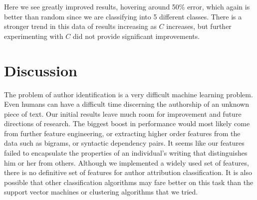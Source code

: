 \documentclass[12pt]{article}
\begin{document}
Here we see greatly improved results, hovering around 50\% error, which again is better than random since we are classifying into 5 different classes. There is a stronger trend in this data of results increasing as $C$ increases, but further experimenting with $C$ did not provide significant improvements.

\section{Discussion}
The problem of author identification is a very difficult machine learning problem. Even humans can have a difficult time discerning the authorship of an unknown piece of text. Our initial results leave much room for improvement and future directions of research. The biggest boost in performance would most likely come from further feature engineering, or extracting higher order features from the data such as bigrams, or syntactic dependency pairs. It seems like our features failed to encapsulate the properties of an individual's writing that distinguishes him or her from others. Although we implemented a widely used set of features, there is no definitive set of features for author attribution classification. It is also possible that other classification algorithms may fare better on this task than the support vector machines or clustering algorithms that we tried.




\end{document}
